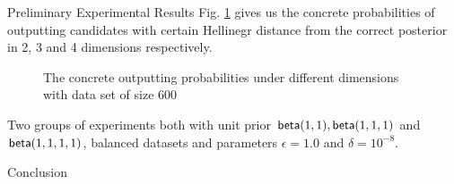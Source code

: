 \documentclass[final,hyperref={pdfpagelabels=false}]{beamer}
\begin{document}
\begin{frame}[t]
\begin{columns}[t]
\begin{column}{.485\textwidth}
\begin{block}{Preliminary Experimental Results}
Fig. \ref{fig_concrete_prob} gives us the concrete probabilities of outputting candidates with certain Hellinegr distance from the correct posterior in 2, 3 and 4 dimensions respectively.
\begin{figure}[H]
\begin{center}
\centering
\caption{The concrete outputting probabilities under different dimensions with data set of size $600$}
\label{fig_concrete_prob}
\end{center}
\end{figure}
\scriptsize{Two groups of experiments both with unit prior $\mathsf{beta}(1,1), \mathsf{beta}(1,1,1)$ and $\mathsf{beta}(1,1,1,1)$, balanced datasets and parameters $\epsilon = 1.0$ and $\delta = 10^{-8}$.}
\end{block}




\begin{block}{Conclusion}


\end{block}
\end{column}
\end{columns}
\end{frame}
\end{document}
